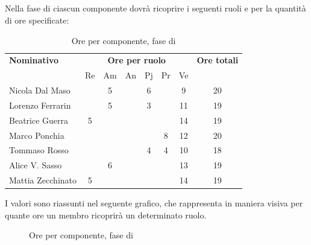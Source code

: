 \subsection{\VV}
Nella fase di \VV{} ciascun componente dovrà ricoprire i seguenti ruoli e per la quantità di ore specificate:

\begin{table}[H]
	\centering
	\begin{tabular}{|l|c|c|c|c|c|c|c|}
		\hline
		\textbf{Nominativo} & 
		\multicolumn{6}{c|}{\textbf{Ore per ruolo}} & 
		\textbf{Ore totali} \\
		& Re & Am & An & Pj & Pr & Ve & \\
		\hline
		Nicola Dal Maso & &5 & &6 & &9 & 20 \\
		Lorenzo Ferrarin & &5 & &3 & &11 & 19 \\
		Beatrice Guerra &5 & & & & &14 & 19 \\
		Marco Ponchia & & & & &8 &12 & 20 \\
		Tommaso Rosso & & & &4 &4 &10 & 18 \\
		Alice V. Sasso & &6 & & & &13 & 19 \\
		Mattia Zecchinato &5 & & & & &14 & 19 \\
		\hline
	\end{tabular}
	\caption{Ore per componente, fase di \VV}
\end{table}
I valori sono riassunti nel seguente grafico, che rappresenta in maniera visiva per quante ore un membro ricoprirà un determinato ruolo.
\begin{figure}[H]
	\centering
	\caption{Ore per componente, fase di \VV}
\end{figure}

